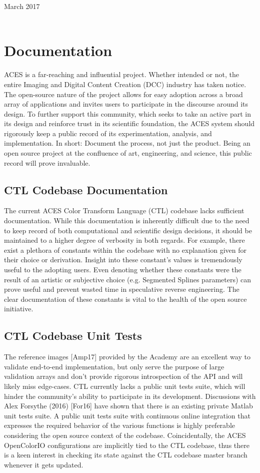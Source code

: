 \documentclass[conference]{IEEEtran}
\begin{document}
\hfill March 2017
\\
\\

\section{Documentation}
ACES is a far-reaching and influential project. Whether intended or not, the entire Imaging and Digital Content Creation (DCC) industry has taken notice. The open-source nature of the project allows for easy adoption across a broad array of applications and invites users to participate in the discourse around its design. To further support this community, which seeks to take an active part in its design and reinforce trust in its scientific foundation, the ACES system should rigorously keep a public record of its experimentation, analysis, and implementation. In short: Document the process, not just the product. Being an open source project at the confluence of art, engineering, and science, this public record will prove invaluable.

\subsection{CTL Codebase Documentation}
The current ACES Color Transform Language (CTL) codebase lacks sufficient documentation. While this documentation is inherently difficult due to the need to keep record of both computational and scientific design decisions, it should be maintained to a higher degree of verbosity in both regards. For example, there exist a plethora of constants within the codebase with no explanation given for their choice or derivation. Insight into these constant's values is tremendously useful to the adopting users. Even denoting whether these constants were the result of an artistic or subjective choice (e.g. Segmented Splines parameters) can prove useful and prevent wasted time in speculative reverse engineering. The clear documentation of these constants is vital to the health of the open source initiative.

\subsection{CTL Codebase Unit Tests}
The reference images [Amp17] provided by the Academy are an excellent way to validate end-to-end implementation, but only serve the purpose of large validation arrays and don't provide rigorous introspection of the API and will likely miss edge-cases. CTL currently lacks a public unit tests suite, which will hinder the community's ability to participate in its development. Discussions with Alex Forsythe (2016) [For16] have shown that there is an existing private Matlab unit tests suite. A public unit tests suite with continuous online integration that expresses the required behavior of the various functions is highly preferable considering the open source context of the codebase. Coincidentally, the ACES OpenColorIO configurations are implicitly tied to the CTL codebase, thus there is a keen interest in checking its state against the CTL codebase master branch whenever it gets updated.
\end{document}
